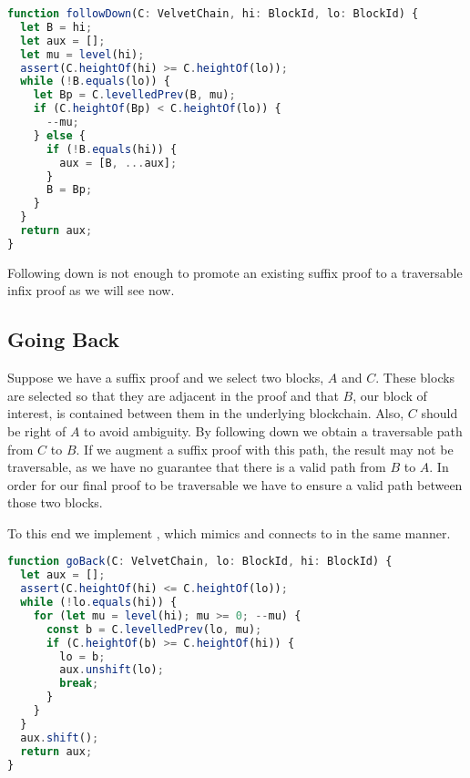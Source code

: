 
\begin{lstlisting}[language=Javascript]
function followDown(C: VelvetChain, hi: BlockId, lo: BlockId) {
  let B = hi;
  let aux = [];
  let mu = level(hi);
  assert(C.heightOf(hi) >= C.heightOf(lo));
  while (!B.equals(lo)) {
    let Bp = C.levelledPrev(B, mu);
    if (C.heightOf(Bp) < C.heightOf(lo)) {
      --mu;
    } else {
      if (!B.equals(hi)) {
        aux = [B, ...aux];
      }
      B = Bp;
    }
  }
  return aux;
}
\end{lstlisting}

Following down is not enough to promote an existing suffix proof to a traversable infix proof as we will see now.

\subsection{Going Back}

Suppose we have a suffix proof and we select two blocks, $A$ and $C$. These blocks are selected so that they are adjacent in the proof and that $B$, our block of interest, is contained between them in the underlying blockchain. Also, $C$ should be right of $A$ to avoid ambiguity. By following down we obtain a traversable path from $C$ to $B$. If we augment a suffix proof with this path, the result may not be traversable, as we have no guarantee that there is a valid path from $B$ to $A$. In order for our final proof to be traversable we have to ensure a valid path between those two blocks.

To this end we implement , which mimics  and connects  to  in the same manner.


\begin{lstlisting}[language=Javascript]
function goBack(C: VelvetChain, lo: BlockId, hi: BlockId) {
  let aux = [];
  assert(C.heightOf(hi) <= C.heightOf(lo));
  while (!lo.equals(hi)) {
    for (let mu = level(hi); mu >= 0; --mu) {
      const b = C.levelledPrev(lo, mu);
      if (C.heightOf(b) >= C.heightOf(hi)) {
        lo = b;
        aux.unshift(lo);
        break;
      }
    }
  }
  aux.shift();
  return aux;
}
\end{lstlisting}

